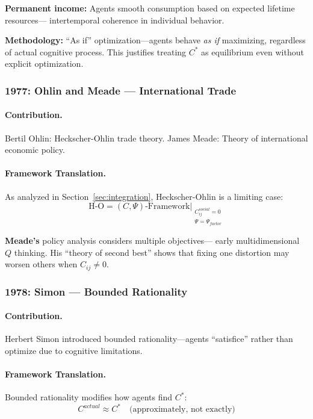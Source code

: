 \documentclass[12pt,a4paper]{article}
\begin{document}
\textbf{Permanent income:} Agents smooth consumption based on expected lifetime resources---
intertemporal coherence in individual behavior.

\textbf{Methodology:} ``As if'' optimization---agents behave \emph{as if} maximizing,
regardless of actual cognitive process. This justifies treating $C^*$ as
equilibrium even without explicit optimization.

\subsubsection{1977: Ohlin and Meade --- International Trade}

\paragraph{Contribution.}
Bertil Ohlin: Heckscher-Ohlin trade theory.
James Meade: Theory of international economic policy.

\paragraph{Framework Translation.}
As analyzed in Section~\ref{sec:integration}, Heckscher-Ohlin is a limiting case:
\begin{equation}
  \text{H-O} = (C, \Psi)\text{-Framework} \Big|_{\substack{C_{ij}^{social} = 0 \\ \Psi = \Psi_{factor}}}
\end{equation}

\textbf{Meade's} policy analysis considers multiple objectives---
early multidimensional $Q$ thinking. His ``theory of second best''
shows that fixing one distortion may worsen others when $C_{ij} \neq 0$.

\subsubsection{1978: Simon --- Bounded Rationality}

\paragraph{Contribution.}
Herbert Simon \citep{simon1955} introduced bounded rationality---agents ``satisfice''
rather than optimize due to cognitive limitations.

\paragraph{Framework Translation.}
Bounded rationality modifies how agents find $C^*$:
\begin{equation}
  C^{actual} \approx C^* \quad \text{(approximately, not exactly)}
\end{equation}
\end{document}
